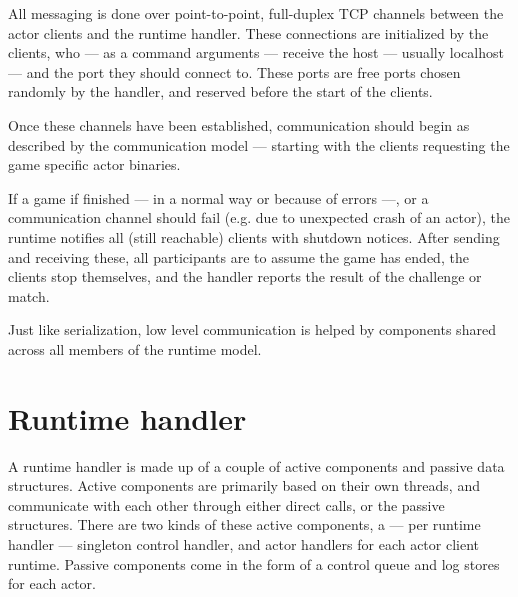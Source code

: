 		All messaging is done over point-to-point, full-duplex TCP channels between the actor clients and the runtime handler. These connections are initialized by the clients, who --- as a command arguments --- receive the host --- usually localhost --- and the port they should connect to. These ports are free ports chosen randomly by the handler, and reserved before the start of the clients.
		
		Once these channels have been established, communication should begin as described by the communication model --- starting with the clients requesting the game specific actor binaries.
		
		If a game if finished --- in a normal way or because of errors ---, or a communication channel should fail (e.g. due to unexpected crash of an actor), the runtime notifies all (still reachable) clients with shutdown notices. After sending and receiving these, all participants are to assume the game has ended, the clients stop themselves, and the handler reports the result of the challenge or match.

		Just like serialization, low level communication is helped by components shared across all members of the runtime model.

	\section{Runtime handler}

	A runtime handler is made up of a couple of active components and passive data structures. Active components are primarily based on their own threads, and communicate with each other through either direct calls, or the passive structures.
	There are two kinds of these active components, a --- per runtime handler --- singleton control handler, and actor handlers for each actor client runtime. Passive components come in the form of a control queue and log stores for each actor.
		
